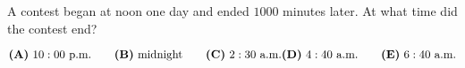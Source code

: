 

A contest began at noon one day and ended $ 1000$ minutes later. At what time did the contest end?

\[ \textbf{(A)}\ 10: 00 \text{ p.m.} \qquad
\textbf{(B)}\ \text{midnight} \qquad
\textbf{(C)}\ 2: 30 \text{ a.m.} \\
\textbf{(D)}\ 4: 40 \text{ a.m.} \qquad
\textbf{(E)}\ 6: 40 \text{ a.m.}
\]

